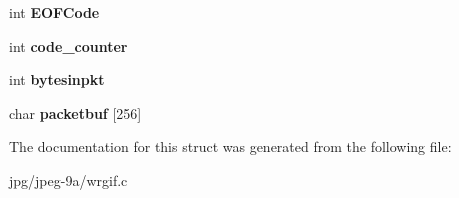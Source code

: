 \begin{DoxyCompactItemize}
\item 
\hypertarget{structgif__dest__struct_a98316fa6a44f4db75986a8f779c18d0f}{int {\bfseries E\+O\+F\+Code}}\label{structgif__dest__struct_a98316fa6a44f4db75986a8f779c18d0f}

\item 
\hypertarget{structgif__dest__struct_a2937a1c5d7b67993db514cccad6f55a8}{int {\bfseries code\+\_\+counter}}\label{structgif__dest__struct_a2937a1c5d7b67993db514cccad6f55a8}

\item 
\hypertarget{structgif__dest__struct_a29a8aa9174f8151c1e269b4b8cfb8047}{int {\bfseries bytesinpkt}}\label{structgif__dest__struct_a29a8aa9174f8151c1e269b4b8cfb8047}

\item 
\hypertarget{structgif__dest__struct_a1649c9fe14e3e1b487c66aeda72d3de2}{char {\bfseries packetbuf} \mbox{[}256\mbox{]}}\label{structgif__dest__struct_a1649c9fe14e3e1b487c66aeda72d3de2}

\end{DoxyCompactItemize}


The documentation for this struct was generated from the following file\+:\begin{DoxyCompactItemize}
\item 
jpg/jpeg-\/9a/wrgif.\+c\end{DoxyCompactItemize}
